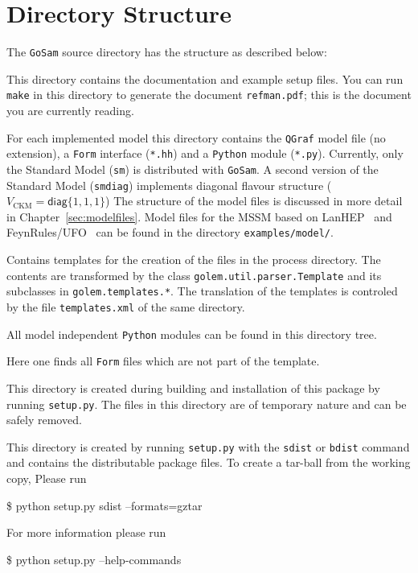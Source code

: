 \documentclass[11pt,a4paper]{refrep}
\newcommand{\golemversion}{{1{.}0}}
\newcommand{\golemv}[1][\golemversion]{{\tt GoSam}\xspace}
\newcommand{\qgraf}{{\tt QGraf}\xspace}
\newcommand{\form}{{\tt Form}\xspace}
\newcommand{\python}{{\tt Python}\xspace}
\begin{document}
\section{Directory Structure}
The \golemv{} source directory has the structure as described below:

 This directory contains the documentation
and example setup files. You can run \texttt{make} in this directory
to generate the document \texttt{refman.pdf}; this is the document you
are currently reading.

 For each implemented model this directory
contains the \qgraf model file (no extension), a \form interface
(\texttt{*.hh}) and a \python module (\texttt{*.py}). Currently,
only the Standard Model (\texttt{sm}) is distributed with \golemv.
A second version of the Standard Model (\texttt{smdiag}) implements
diagonal flavour structure ($V_{\text{CKM}}=\mathsf{diag}\{1,1,1\}$)
The structure of the model files is discussed in more detail in
Chapter~\ref{sec:modelfiles}. Model files for the MSSM based on 
LanHEP~\cite{Semenov:2010qt} and FeynRules/UFO~\cite{Degrande:2011ua}  
can be found in the directory 
\texttt{examples/model/}.

 Contains templates for the creation
of the files in the process directory. The contents are transformed
by the class \texttt{golem.util.parser.Template} and its subclasses
in \texttt{golem.templates.*}. The translation of the templates is
controled by the file \texttt{templates.xml} of the same directory.

 All model independent \python modules
can be found in this directory tree.

 Here one finds all \form files
which are not part of the template.

 This directory is created during
building and installation of this package by running \texttt{setup.py}.
The files in this directory are of temporary nature and can be safely
removed.

 This directory is created by running
\texttt{setup.py} with the \texttt{sdist} or \texttt{bdist} command
and contains the distributable package files.
To create a tar-ball from the working copy, Please run
\begin{example}
\$ python setup.py sdist --formats=gztar
\end{example}
For more information
please run
\begin{example}
\$ python setup.py --help-commands
\end{example}
\end{document}
